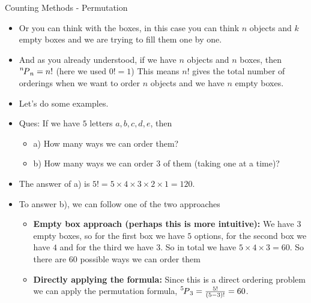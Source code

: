 \documentclass[8pt,usepdftitle=false]{beamer}
\begin{document}
\begin{frame}[allowframebreaks]{Counting Methods - Permutation}
\begin{itemize}
\item Or you can think with the boxes, in this case you can think $n$ objects and $k$ empty boxes and we are trying to fill them one by one. 

\item And as you already understood, if we have $n$ objects and $n$ boxes, then $ \Permute[n]{n} = n!$ (here we used  $0! = 1$) This means $n!$ gives the total number of orderings when we want to order $n$ objects and we have $n$ empty boxes.

\item Let's do some examples.






\framebreak



\item Ques: If we have $5$ letters $a, b, c, d, e$, then

\begin{itemize}
\item a) How many ways we can order them?
\item b) How many ways we can order $3$ of them (taking one at a time)?
\end{itemize} 

\item The answer of a) is $5! = 5 \times 4 \times 3 \times 2 \times 1 = 120$. 


\item To answer b), we can follow one of the two approaches

\medskip

\begin{itemize}
\item \textbf{Empty box approach (perhaps this is more intuitive):} We have $3$ empty boxes, so for the first box we have $5$ options, for the second box we have $4$ and for the third we have $3$. So in total we have $5 \times 4 \times 3 = 60$. So there are $60$ possible ways we can order them 

\medskip

\item \textbf{Directly applying the formula:} Since this is a direct ordering problem we can apply the permutation formula, $\Permute[5]{3} = \frac{5!}{(5 - 3)!} = 60$.
\end{itemize}



\end{itemize}
\end{frame}
\end{document}

